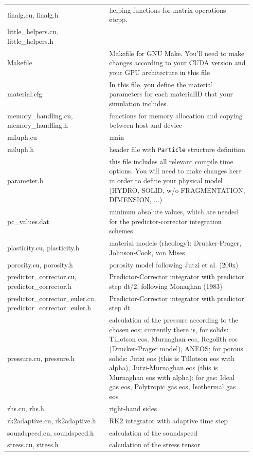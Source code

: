 \documentclass[10pt,fleqn,twoside]{article}
\begin{document}
\begin{table}
\begin{tabular}[b]{p{6cm} p{9cm}}
linalg.cu, linalg.h		&	helping functions for matrix operations etcpp.	\\
little\_helpers.cu, little\_helpers.h	&	\\
Makefile	&	Makefile for GNU Make. You'll need to make changes according to your CUDA version and your GPU architecture in this file	\\
material.cfg	&	In this file, you define the material parameters for each materialID that your simulation includes.	\\
memory\_handling.cu, memory\_handling.h	&	functions for memory allocation and copying between host and device	\\
miluph.cu	&	main	\\
miluph.h	&	header file with \verb|Particle| structure definition	\\
parameter.h	&	this file includes all relevant compile time options. You will need to make changes here in order to define your physical model (HYDRO, SOLID, w/o FRAGMENTATION, DIMENSION, ...)	\\
pc\_values.dat	&	mininum absolute values, which are needed for the predictor-corrector integration schemes	\\
plasticity.cu, plasticity.h		&	material models (rheology): Drucker-Prager, Johnson-Cook, von Mises	\\
porosity.cu, porosity.h		&	porosity model following Jutzi et al. (200x)	\\
predictor\_corrector.cu, predictor\_corrector.h	&	Predictor-Corrector integrator with predictor step dt/2, following Monaghan (1983)	\\
predictor\_corrector\_euler.cu, predictor\_corrector\_euler.h		&	Predictor-Corrector integrator with predictor step dt	\\
pressure.cu, pressure.h		&	calculation of the pressure according to the chosen eos; currently there is, for solids: Tillotson eos, Murnaghan eos, Regolith eos (Drucker-Prager model), ANEOS; for porous solids: Jutzi eos (this is Tillotson eos with alpha), Jutzi-Murnaghan eos (this is Murnaghan eos with alpha); for gas: Ideal gas eos, Polytropic gas eos, Isothermal gas eos		\\
rhs.cu, rhs.h	&	right-hand sides	\\
rk2adaptive.cu, rk2adaptive.h	&	RK2 integrator with adaptive time step	\\
soundspeed.cu, soundspeed.h		&	calculation of the soundspeed	\\
stress.cu, stress.h		&	calculation of the stress tensor \\

\end{tabular}
\end{table}
\end{document}
